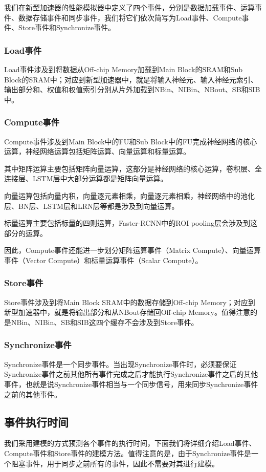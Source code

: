 我们在新型加速器的性能模拟器中定义了四个事件，分别是数据加载事件、运算事件、数据存储事件和同步事件，我们将它们依次简写为Load事件、Compute事件、Store事件和Synchronize事件。

\subsubsection{Load事件}
Load事件涉及到将数据从Off-chip Memory加载到Main Block的SRAM和Sub Block的SRAM中；对应到新型加速器中，就是将输入神经元、输入神经元索引、输出部分和、权值和权值索引分别从片外加载到NBin、NIBin、NBout、SB和SIB中。

\subsubsection{Compute事件}
Compute事件涉及到Main Block中的FU和Sub Block中的FU完成神经网络的核心运算，神经网络运算包括矩阵运算、向量运算和标量运算。

其中矩阵运算主要包括矩阵向量运算，这部分是神经网络的核心运算，卷积层、全连接层、LSTM层中大部分运算都是矩阵向量运算。

向量运算包括向量内积，向量逐元素相乘，向量逐元素相乘，神经网络中的池化层、BN层、LSTM层和LRN层等都是涉及到向量运算。

标量运算主要包括标量的四则运算，Faster-RCNN中的ROI pooling层会涉及到这部分的运算。

因此，Compute事件还能进一步划分矩阵运算事件（Matrix Compute）、向量运算事件（Vector Compute）和标量运算事件（Scalar Compute）。

\subsubsection{Store事件}
Store事件涉及到将Main Block SRAM中的数据存储到Off-chip Memory；对应到新型加速器中，就是将输出部分和从NBout存储回Off-chip Memory。值得注意的是NBin、NIBin、SB和SIB这四个缓存不会涉及到Store事件。

\subsubsection{Synchronize事件}
Synchronize事件是一个同步事件。当出现Synchronize事件时，必须要保证Synchronize事件之前其他所有事件完成之后才能执行Synchronize事件之后的其他事件，也就是说Synchronize事件相当与一个同步信号，用来同步Synchronize事件之前的其他事件。

\subsection{事件执行时间}
我们采用建模的方式预测各个事件的执行时间，下面我们将详细介绍Load事件、Compute事件和Store事件的建模方法。值得注意的是，由于Synchronize事件是一个阻塞事件，用于同步之前所有的事件，因此不需要对其进行建模。


